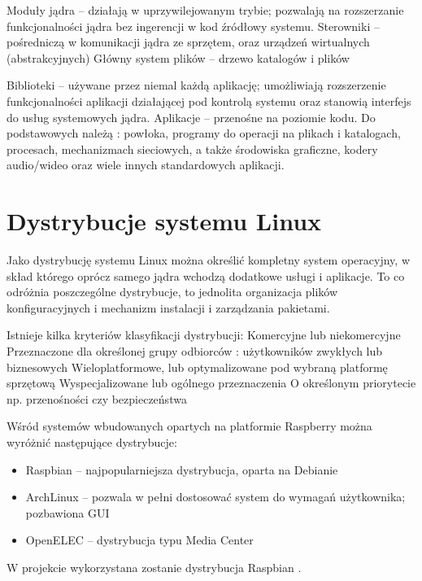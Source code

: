 Moduły jądra – działają w uprzywilejowanym trybie; pozwalają na rozszerzanie funkcjonalności jądra bez ingerencji w kod źródłowy systemu.
Sterowniki – pośredniczą w komunikacji jądra ze sprzętem, oraz urządzeń wirtualnych (abstrakcyjnych)
Główny system plików – drzewo katalogów i plików

Biblioteki – używane przez niemal każdą aplikację; umożliwiają rozszerzenie funkcjonalności aplikacji działającej pod kontrolą systemu oraz stanowią interfejs do usług systemowych jądra.
Aplikacje – przenośne na poziomie kodu. Do podstawowych należą : powłoka, programy do operacji na plikach i katalogach, procesach, mechanizmach sieciowych, a także środowiska graficzne, kodery audio/wideo oraz wiele innych standardowych aplikacji.

\section{Dystrybucje systemu Linux}

Jako dystrybucję systemu Linux można określić kompletny system operacyjny, w skład którego oprócz samego jądra wchodzą dodatkowe usługi i aplikacje. To co odróżnia poszczególne dystrybucje, to jednolita organizacja plików konfiguracyjnych i mechanizm instalacji i zarządzania pakietami.

Istnieje kilka kryteriów klasyfikacji dystrybucji:
Komercyjne lub niekomercyjne
Przeznaczone dla określonej grupy odbiorców : użytkowników zwykłych lub biznesowych
Wieloplatformowe, lub optymalizowane pod wybraną platformę sprzętową
Wyspecjalizowane lub ogólnego przeznaczenia
O określonym priorytecie np. przenośności czy bezpieczeństwa

\begin{description}
\item Wśród systemów wbudowanych opartych na platformie Raspberry można wyróżnić następujące dystrybucje:
	\begin{itemize}[noitemsep]
	\item Raspbian – najpopularniejsza dystrybucja, oparta na Debianie
	\item ArchLinux – pozwala w pełni dostosować system do wymagań użytkownika; pozbawiona GUI
	\item OpenELEC – dystrybucja typu Media Center
	\end{itemize}
\end{description}

W projekcie wykorzystana zostanie dystrybucja Raspbian .

